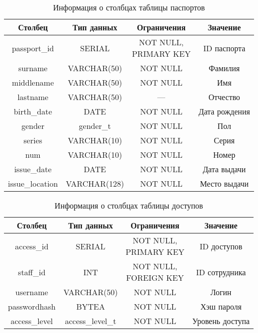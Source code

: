 \begin{table}[H]
\begin{center}
	\captionsetup{justification=raggedright,singlelinecheck=off,margin=5mm}
	\caption{Информация о столбцах таблицы паспортов}
	\begin{tabular}{| c | c | c | c |}
		\hline
		Столбец & Тип данных & Ограничения & Значение \\
		\hline
		passport\_id & SERIAL & \makecell{NOT NULL, \\ PRIMARY KEY} & ID паспорта \\
		\hline
		surname & VARCHAR(50) & NOT NULL & Фамилия \\
		\hline
		middlename & VARCHAR(50) & NOT NULL & Имя \\
		\hline
		lastname & VARCHAR(50) & --- & Отчество \\
		\hline
		birth\_date & DATE & NOT NULL & Дата рождения\\
		\hline
		gender & gender\_t & NOT NULL & Пол \\
		\hline
		series & VARCHAR(10) & NOT NULL & Серия \\
		\hline
		num & VARCHAR(10) & NOT NULL & Номер \\
		\hline
		issue\_date & DATE & NOT NULL & Дата выдачи\\
		\hline
		issue\_location & VARCHAR(128) & NOT NULL & Место выдачи \\
		\hline
	\end{tabular}
	\label{table:passports-columns}
\end{center}
\end{table}

\begin{table}[H]
\begin{center}
	\captionsetup{justification=raggedright,singlelinecheck=off,margin=5mm}
	\caption{Информация о столбцах таблицы доступов}
	\begin{tabular}{| c | c | c | c |}
		\hline
		Столбец & Тип данных & Ограничения & Значение \\
		\hline
		access\_id & SERIAL & \makecell{NOT NULL, \\ PRIMARY KEY} & ID доступов \\
		\hline
		staff\_id & INT &  \makecell{NOT NULL, \\ FOREIGN KEY} & ID сотрудника \\
		\hline
		username & VARCHAR(50) & NOT NULL & Логин \\
		\hline
		passwordhash & BYTEA  & NOT NULL & Хэш пароля \\
		\hline
		access\_level & access\_level\_t & NOT NULL & Уровень доступа \\
		\hline
	\end{tabular}
	\label{table:accesses-columns}
\end{center}
\end{table}

